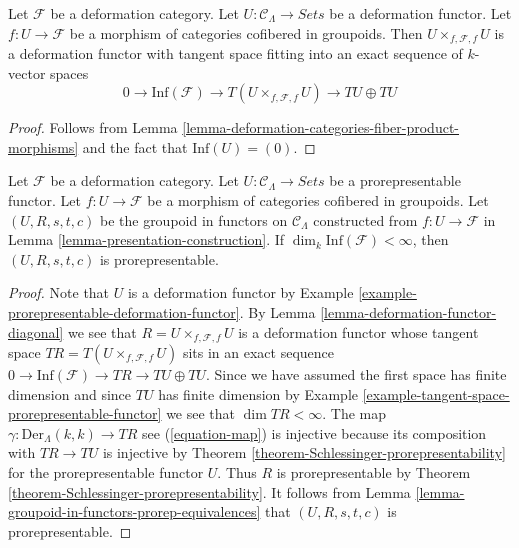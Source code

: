 \begin{lemma}
\label{lemma-deformation-functor-diagonal}
Let $\mathcal{F}$ be a deformation category.
Let $U : \mathcal{C}_\Lambda \to \textit{Sets}$ be a deformation functor.
Let $f: U \to \mathcal{F}$ be a morphism of categories cofibered in groupoids.
Then $U \times_{f, \mathcal{F}, f} U$ is a deformation functor
with tangent space fitting into an exact sequence of $k$-vector spaces
$$
0 \to \text{Inf}(\mathcal{F}) \to
T(U \times_{f, \mathcal{F}, f} U) \to TU \oplus TU
$$
\end{lemma}

\begin{proof}
Follows from
Lemma \ref{lemma-deformation-categories-fiber-product-morphisms}
and the fact that $\text{Inf}(U) = (0)$.
\end{proof}

\begin{lemma}
\label{lemma-prorepresentable-groupoid-in-functors-construction}
Let $\mathcal{F}$ be a deformation category.
Let $U : \mathcal{C}_\Lambda \to \textit{Sets}$ be a prorepresentable functor.
Let $f : U \to \mathcal{F}$ be a morphism of categories cofibered in groupoids.
Let $(U, R, s, t, c)$ be the groupoid in functors on $\mathcal{C}_\Lambda$
constructed from $f : U \to \mathcal{F}$ in
Lemma \ref{lemma-presentation-construction}. If
$\dim_k \text{Inf}(\mathcal{F}) < \infty$, then
$(U, R, s, t, c)$ is prorepresentable.
\end{lemma}

\begin{proof}
Note that $U$ is a deformation functor by
Example \ref{example-prorepresentable-deformation-functor}.
By
Lemma \ref{lemma-deformation-functor-diagonal}
we see that $R = U \times_{f, \mathcal{F}, f} U$
is a deformation functor whose tangent space
$TR = T(U \times_{f, \mathcal{F}, f} U)$ sits in an exact sequence
$0 \to \text{Inf}(\mathcal{F}) \to TR \to TU \oplus TU$.
Since we have assumed the first space has finite dimension and since
$TU$ has finite dimension by
Example \ref{example-tangent-space-prorepresentable-functor}
we see that $\dim TR < \infty$. The map
$\gamma : \text{Der}_\Lambda(k, k) \to TR$ see (\ref{equation-map})
is injective because its composition with $TR \to TU$ is injective by
Theorem \ref{theorem-Schlessinger-prorepresentability}
for the prorepresentable functor $U$. Thus $R$ is prorepresentable by
Theorem \ref{theorem-Schlessinger-prorepresentability}.
It follows from
Lemma \ref{lemma-groupoid-in-functors-prorep-equivalences}
that $(U, R, s, t, c)$ is prorepresentable.
\end{proof}

